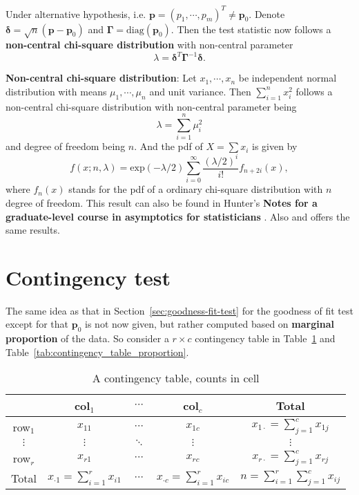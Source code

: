 \documentclass[a4paper,12pt]{article}
\begin{document}
Under alternative hypothesis, i.e. $\bm{p}=\left(p_1, \cdots, p_m\right)^T\neq\bm{p}_0$. Denote $\bm{\delta} = \sqrt{n}\left(\bm{p} - \bm{p}_0\right)$ and $\bm{\Gamma} = \mathrm{diag}\left(\bm{p}_0\right)$. Then the test statistic now follows a \textbf{non-central chi-square distribution} with non-central parameter
\[
  \lambda = \bm{\delta}^T\bm{\Gamma}^{-1}\bm{\delta}
  .
\]
\par
\textbf{Non-central chi-square distribution}: Let $x_1, \cdots, x_n$ be independent normal distribution with means $\mu_1, \cdots, \mu_n$ and unit variance. Then $\sum\limits_{i = 1}^nx_i^2$ follows a non-central chi-square distribution with non-central parameter being
\[
  \lambda = \sum\limits_{i = 1}^n\mu_i^2
\]
and degree of freedom being $n$. And the pdf of $X = \sum x_i$ is given by
\[
  f\left(x;n,\lambda\right)
  = \mathrm{exp}\left(-\lambda / 2\right)
  \sum\limits_{i = 0}^\infty\frac{\left(\lambda / 2\right)^i}{i!}
  f_{n + 2i}\left(x\right)
  ,
\]
where $f_{n}\left(x\right)$ stands for the pdf of a ordinary chi-square distribution with $n$ degree of freedom. This result can also be found in Hunter's \textbf{Notes for a graduate-level course in asymptotics for statisticians} \citep{Hunter2014p-}. Also \citet{Guenther1977p83-83} and \citet{Meng1966p965-975} offers the same results.

\section{Contingency test}
\label{sec:contingency-test}

The same idea as that in Section~\ref{sec:goodness-fit-test} for the goodness of fit test except for that $\bm{p}_0$ is not now given, but rather computed based on \textbf{marginal proportion} of the data. So consider a $r\times c$ contingency table in Table~\ref{tab:contingency_table_count} and Table~\ref{tab:contingency_table_proportion}.
\begin{table}[htbp]
  \centering
  \begin{tabular}{|c|c|c|c|c|}
    \hline
    & col$_1$ & $\cdots $ & col$_c$ & Total \\
    \hline
    row$_1$ & $x_{11}$ & $\cdots$ & $x_{1c}$ & $x_{1\cdot} = \sum\limits_{j = 1}^cx_{1j}$    \\
    \hline
    $\vdots$ & $\vdots$ & $\ddots$ & $\vdots$ & $\vdots$    \\
    \hline
    row$_r$ & $x_{r1}$ & $\cdots$ & $x_{rc}$ & $x_{r\cdot} = \sum\limits_{j = 1}^cx_{rj}$    \\
    \hline
    Total & $x_{\cdot 1} = \sum\limits_{i = 1}^rx_{i1}$
              & $\cdots$
                          & $x_{\cdot c} = \sum\limits_{i = 1}^rx_{ic}$
                                    & $n = \sum\limits_{i = 1}^r\sum\limits_{j = 1}^cx_{ij}$    \\
    \hline
  \end{tabular}
  \caption{A contingency table, counts in cell}
  \label{tab:contingency_table_count}
\end{table}
\end{document}
